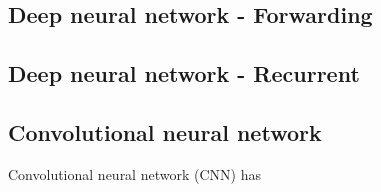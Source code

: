 \subsection{Deep neural network - Forwarding}
\subsection{Deep neural network - Recurrent}
\subsection{Convolutional neural network}
Convolutional neural network (CNN) has